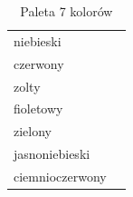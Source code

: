 \begin{table}[h]
\caption{Paleta 7 kolorów}
\label{r_zestaw_kolorow}
	\centering
	\begin{small}
		\begin{tabular}{|p{3cm}|p{4cm}|}
			\hline
			niebieski & \cellcolor{niebieski}\\
			czerwony & \cellcolor{czerwony}\\
			zolty & \cellcolor{zolty}\\
			fioletowy & \cellcolor{fioletowy}\\
			zielony & \cellcolor{zielony}\\
			jasnoniebieski & \cellcolor{jasnoniebieski}\\
			ciemnioczerwony & \cellcolor{ciemnioczerwony}\\
			\hline
		\end{tabular}
	\end{small}
\end{table}

